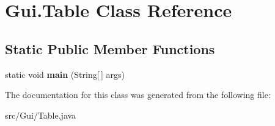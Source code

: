 \hypertarget{class_gui_1_1_table}{}\section{Gui.\+Table Class Reference}
\label{class_gui_1_1_table}
\subsection*{Static Public Member Functions}
\begin{DoxyCompactItemize}
\item 
\mbox{\label{class_gui_1_1_table_aa3ea31ce1a22749e70a7256a7996ef97}} 
static void {\bfseries main} (String\mbox{[}$\,$\mbox{]} args)
\end{DoxyCompactItemize}


The documentation for this class was generated from the following file\+:\begin{DoxyCompactItemize}
\item 
src/\+Gui/Table.\+java\end{DoxyCompactItemize}
